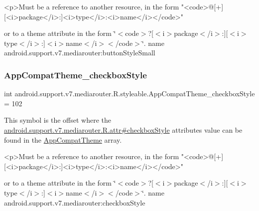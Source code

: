 \begin{DoxyVerb}      <p>Must be a reference to another resource, in the form "<code>@[+][<i>package</i>:]<i>type</i>:<i>name</i></code>"
\end{DoxyVerb}
 or to a theme attribute in the form \char`\"{}$<$code$>$?\mbox{[}$<$i$>$package$<$/i$>$\+:\mbox{]}\mbox{[}$<$i$>$type$<$/i$>$\+:\mbox{]}$<$i$>$name$<$/i$>$$<$/code$>$\char`\"{}.  name android.\+support.\+v7.\+mediarouter\+:button\+Style\+Small \mbox{\label{classandroid_1_1support_1_1v7_1_1mediarouter_1_1R_1_1styleable_a2149fa776964dfd41a14357ea2f3c8c5}} 
\subsubsection{\texorpdfstring{App\+Compat\+Theme\+\_\+checkbox\+Style}{AppCompatTheme\_checkboxStyle}}
{\footnotesize\ttfamily int android.\+support.\+v7.\+mediarouter.\+R.\+styleable.\+App\+Compat\+Theme\+\_\+checkbox\+Style = 102\hspace{0.3cm}{\ttfamily [static]}}

This symbol is the offset where the \hyperlink{classandroid_1_1support_1_1v7_1_1mediarouter_1_1R_1_1attr_ae70108ea769d69866d5beea190485fb3}{android.\+support.\+v7.\+mediarouter.\+R.\+attr\#checkbox\+Style} attribute\textquotesingle{}s value can be found in the \hyperlink{classandroid_1_1support_1_1v7_1_1mediarouter_1_1R_1_1styleable_a4e3d3900c75d49aeb2f283cac00214d6}{App\+Compat\+Theme} array.

\begin{DoxyVerb}      <p>Must be a reference to another resource, in the form "<code>@[+][<i>package</i>:]<i>type</i>:<i>name</i></code>"
\end{DoxyVerb}
 or to a theme attribute in the form \char`\"{}$<$code$>$?\mbox{[}$<$i$>$package$<$/i$>$\+:\mbox{]}\mbox{[}$<$i$>$type$<$/i$>$\+:\mbox{]}$<$i$>$name$<$/i$>$$<$/code$>$\char`\"{}.  name android.\+support.\+v7.\+mediarouter\+:checkbox\+Style \mbox{\label{classandroid_1_1support_1_1v7_1_1mediarouter_1_1R_1_1styleable_a3664100d2a81d9957c8aea792d6b8c56}} 
